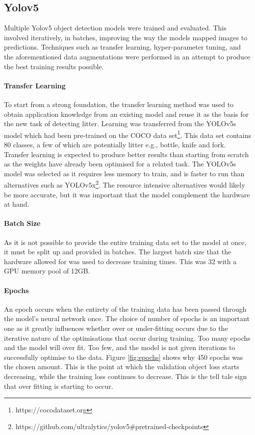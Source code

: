 \documentclass{thesis}
\begin{document}
\subsection{Yolov5}

Multiple Yolov5 object detection models were trained and evaluated. This involved iteratively, in batches, improving the way the models mapped images to predictions. Techniques such as transfer learning, hyper-parameter tuning, and the aforementioned data augmentations were performed in an attempt to produce the best training results possible.

\paragraph{Transfer Learning}

To start from a strong foundation, the transfer learning method was used to obtain application knowledge from an existing model and reuse it as the basis for the new task of detecting litter. Learning was transferred from the YOLOv5s model which had been pre-trained on the COCO data set\footnote{https://cocodataset.org}. This data set contains 80 classes, a few of which are potentially litter e.g., bottle, knife and fork. Transfer learning is expected to produce better results than starting from scratch as the weights have already been optimised for a related task. The YOLOv5s model was selected as it requires less memory to train, and is faster to run than alternatives such as YOLOv5x\footnote{https://github.com/ultralytics/yolov5\#pretrained-checkpoints}. The resource intensive alternatives would likely be more accurate, but it was important that the model complement the hardware at hand.

\paragraph{Batch Size} 

As it is not possible to provide the entire training data set to the model at once, it must be split up and provided in batches. The largest batch size that the hardware allowed for was used to decrease training times. This was 32 with a GPU memory pool of 12GB.

\paragraph{Epochs} 

An epoch occurs when the entirety of the training data has been passed through the model's neural network once. The choice of number of epochs is an important one as it greatly influences whether over or under-fitting occurs due to the iterative nature of the optimisations that occur during training. Too many epochs and the model will over fit. Too few, and the model is not given iterations to successfully optimise to the data. Figure \ref{fig:epochs} shows why 450 epochs was the chosen amount. This is the point at which the validation object loss starts decreasing, while the training loss continues to decrease. This is the tell tale sign that over fitting is starting to occur.
\end{document}
